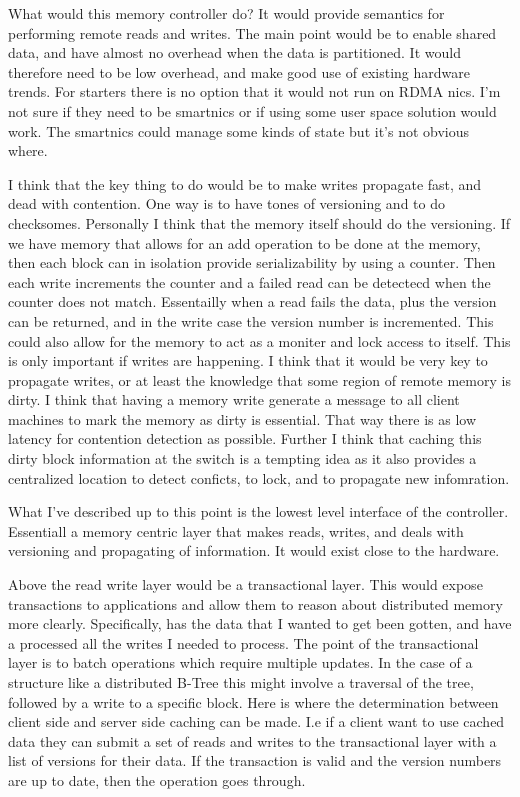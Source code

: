 What would this memory controller do? It would provide semantics for
performing remote reads and writes. The main point would be to enable shared
data, and have almost no overhead when the data is partitioned. It would
therefore need to be low overhead, and make good use of existing hardware
trends. For starters there is no option that it would not run on RDMA nics.
I'm not sure if they need to be smartnics or if using some user space
solution would work. The smartnics could manage some kinds of state but it's
not obvious where.

I think that the key thing to do would be to make writes propagate fast, and
dead with contention. One way is to have tones of versioning and to do
checksomes. Personally I think that the memory itself should do the
versioning. If we have memory that allows for an add operation to be done at
the memory, then each block can in isolation provide serializability by using
a counter. Then each write increments the counter and a failed read can be
detectecd when the counter does not match. Essentailly when a read fails the
data, plus the version can be returned, and in the write case the version
number is incremented. This could also allow for the memory to act as a
moniter and lock access to itself. This is only important if writes are
happening. I think that it would be very key to propagate writes, or at least
the knowledge that some region of remote memory is dirty. I think that having
a memory write generate a message to all client machines to mark the memory
as dirty is essential. That way there is as low latency for contention
detection as possible. Further I think that caching this dirty block
information at the switch is a tempting idea as it also provides a
centralized location to detect conficts, to lock, and to propagate new
infomration.

What I've described up to this point is the lowest level interface of the
controller. Essentiall a memory centric layer that makes reads, writes, and
deals with versioning and propagating of information. It would exist close to
the hardware.

Above the read write layer would be a transactional layer. This would expose
transactions to applications and allow them to reason about distributed
memory more clearly. Specifically, has the data that I wanted to get been
gotten, and have a processed all the writes I needed to process. The point of
the transactional layer is to batch operations which require multiple
updates. In the case of a structure like a distributed B-Tree this might
involve a traversal of the tree, followed by a write to a specific block.
Here is where the determination between client side and server side caching
can be made. I.e if a client want to use cached data they can submit a set of
reads and writes to the transactional layer with a list of versions for their
data. If the transaction is valid and the version numbers are up to date,
then the operation goes through.

